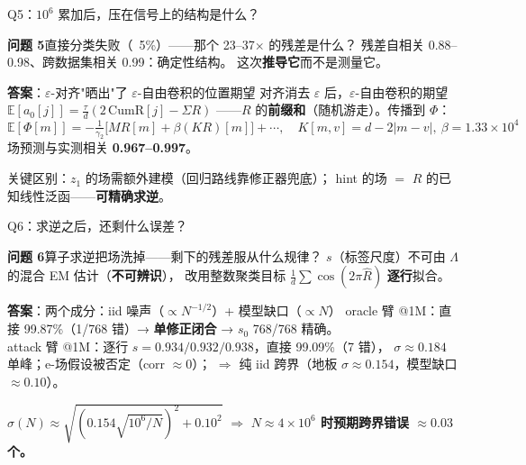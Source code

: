 \documentclass[11pt,aspectratio=169]{ctexbeamer}
\begin{document}
\begin{frame}{Q5：$10^6$ 累加后，压在信号上的结构是什么？}
  \begin{block}{\textbf{问题 5}\quad 直接分类失败（~5\%）——那个 23--37$\times$ 的残差是什么？}
    \small 残差自相关 0.88--0.98、跨数据集相关 0.99：确定性结构。
    这次\textbf{推导它}而不是测量它。
  \end{block}
  \begin{exampleblock}{\textbf{答案}：$\varepsilon$-对齐"晒出"了 $\varepsilon$-自由卷积的位置期望}
    \small 对齐消去 $\varepsilon$ 后，$\varepsilon$-自由卷积的期望
    $\mathbb{E}[a_0[j]]=\frac{\tau}{d}(2\,\mathrm{CumR}[j]-\Sigma R)$
    ——$R$ 的\textbf{前缀和}（随机游走）。传播到 $\Phi$：
    \[
      \mathbb{E}[\Phi[m]] = -\tfrac{1}{\gamma_2}\bigl[M R[m]
      + \beta (K R)[m]\bigr] + \cdots,
      \quad K[m,v]=d-2|m-v|,\ \beta=1.33\times10^4
    \]
    场预测与实测相关 \textbf{0.967--0.997}。
  \end{exampleblock}
  \begin{center}
    {\color{sered}\small 关键区别：$z_1$ 的场需额外建模（回归路线靠修正器兜底）；
    hint 的场 $=$ $R$ 的已知线性泛函——\textbf{可精确求逆}。}
  \end{center}
\end{frame}

\begin{frame}{Q6：求逆之后，还剩什么误差？}
  \begin{block}{\textbf{问题 6}\quad 算子求逆把场洗掉——剩下的残差服从什么规律？}
    \small $s$（标签尺度）不可由 $\Lambda$ 的混合 EM 估计（\textbf{不可辨识}），
    改用整数聚类目标 $\frac1d\sum\cos(2\pi\hat R)$ \textbf{逐行}拟合。
  \end{block}
  \begin{exampleblock}{\textbf{答案}：两个成分：iid 噪声（$\propto N^{-1/2}$）+ 模型缺口（$\propto N$）}
    \small oracle 臂 @1M：直接 99.87\%（1/768 错）→ \textbf{单修正闭合}
    → $s_0$ 768/768 精确。\\
    attack 臂 @1M：逐行 $s=0.934/0.932/0.938$，直接 99.09\%（7 错），
    $\sigma\approx0.184$ 单峰；e-场假设被否定（corr $\approx0$）；
    $\Rightarrow$ 纯 iid 跨界（地板 $\sigma\approx0.154$，模型缺口 $\approx0.10$）。
  \end{exampleblock}
  \begin{center}
    \small $\sigma(N)\approx\sqrt{(0.154\sqrt{10^6/N})^2+0.10^2}$
    $\Rightarrow$ \textbf{$N\approx4\times10^6$ 时预期跨界错误 $\approx0.03$ 个。}
  \end{center}
\end{frame}
\end{document}
